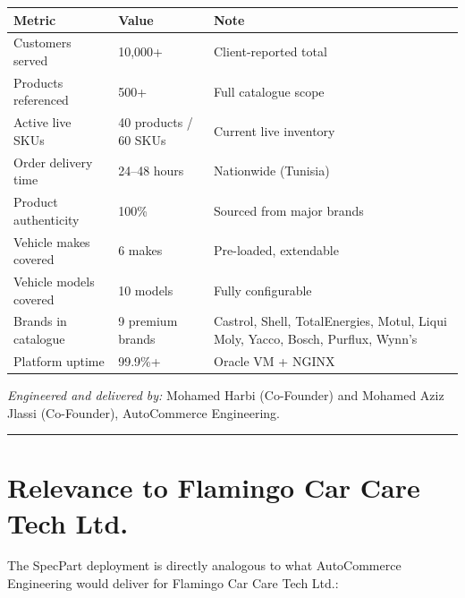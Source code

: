 \documentclass[11pt,a4paper]{article}
\begin{document}
\begin{center}
\renewcommand{\arraystretch}{1.5}
\begin{tabular}{@{}p{5.5cm}p{3cm}p{6cm}@{}}
\toprule
\textbf{Metric} & \textbf{Value} & \textbf{Note} \\
\midrule
Customers served         & 10,000+             & Client-reported total \\
Products referenced      & 500+                & Full catalogue scope \\
Active live SKUs         & 40 products / 60 SKUs & Current live inventory \\
Order delivery time      & 24--48 hours        & Nationwide (Tunisia) \\
Product authenticity     & 100\%               & Sourced from major brands \\
Vehicle makes covered    & 6 makes             & Pre-loaded, extendable \\
Vehicle models covered   & 10 models           & Fully configurable \\
Brands in catalogue      & 9 premium brands    & Castrol, Shell, TotalEnergies,
                                                  Motul, Liqui Moly, Yacco,
                                                  Bosch, Purflux, Wynn's \\
Platform uptime          & 99.9\%+             & Oracle VM + NGINX \\
\bottomrule
\end{tabular}
\end{center}

\medskip
\noindent\textit{Engineered and delivered by:} Mohamed Harbi (Co-Founder)
and Mohamed Aziz Jlassi (Co-Founder), AutoCommerce Engineering.

\bigskip
\rule{\textwidth}{0.4pt}
\bigskip

\section*{Relevance to Flamingo Car Care Tech Ltd.}

The SpecPart deployment is directly analogous to what AutoCommerce
Engineering would deliver for Flamingo Car Care Tech Ltd.:
\end{document}
